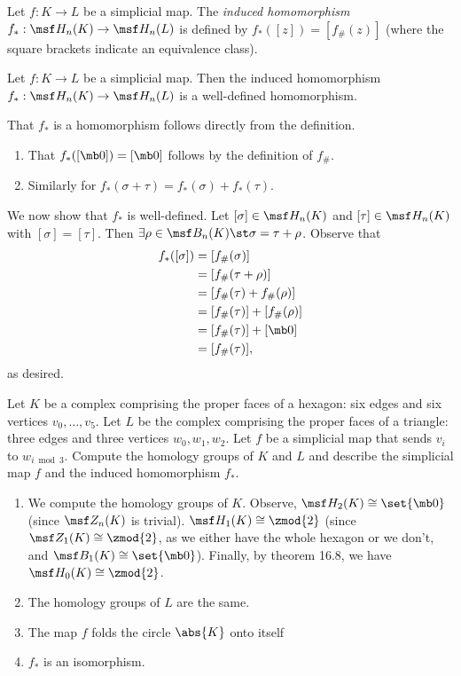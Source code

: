 \begin{definition}
  Let $f : K \to L$ be a simplicial map. The \emph{induced homomorphism} $f_* :
  \msf H_n(K) \to \msf H_n(L)$ is defined by $f_*([z]) = [f_\#(z)]$ (where the
  square brackets indicate an equivalence class).
\end{definition}
\begin{problem}[16.17]
  Let $f : K \to L$ be a simplicial map. Then the induced homomorphism $f_* :
  \msf H_n(K) \to \msf H_n(L)$ is a well-defined homomorphism.
\end{problem}
\begin{solution}
  That $f_*$ is a homomorphism follows directly from the definition.
  \begin{enumerate}[label=(\arabic*)]
    \item That $f_*([\mb 0]) = [\mb 0]$ follows by the definition of $f_{\#}$.
    \item Similarly for $f_*(\sigma + \tau) = f_*(\sigma) + f_*(\tau)$.
  \end{enumerate}
  We now show that $f_*$ is well-defined. Let $[\sigma] \in \msf H_n(K)$ and
  $[\tau] \in \msf H_n(K)$ with $[\sigma] = [\tau]$. Then $\exists \rho \in \msf
  B_n(K) \st \sigma = \tau + \rho$. Observe that
  \begin{align*}
    f_*([\sigma])
    &= [f_{\#}(\sigma)] \\
    &= [f_{\#}(\tau + \rho)] \\
    &= [f_{\#}(\tau) + f_{\#}(\rho)] \\
    &= [f_{\#}(\tau)] + [f_{\#}(\rho)] \\
    &= [f_{\#}(\tau)] + [\mb 0] \\
    &= [f_{\#}(\tau)],
  \end{align*}
  as desired.
\end{solution}
\begin{problem}[16.18]
  Let $K$ be a complex comprising the proper faces of a hexagon: six edges and
  six vertices $v_0, \ldots, v_5$. Let $L$ be the complex comprising the proper
  faces of a triangle: three edges and three vertices $w_0, w_1, w_2$. Let $f$
  be a simplicial map that sends $v_i$ to $w_{i \bmod 3}$. Compute the homology
  groups of $K$ and $L$ and describe the simplicial map $f$ and the induced
  homomorphism $f_*$.
\end{problem}
\begin{solution}
  \begin{enumerate}[label=(\arabic*)]
    \item We compute the homology groups of $K$. Observe, $\msf H_2(K) \cong
      \set{\mb 0}$ (since $\msf Z_n(K)$ is trivial). $\msf H_1(K) \cong
      \zmod{2}$ (since $\msf Z_1(K) \cong \zmod{2}$, as we either have the whole
      hexagon or we don't, and $\msf B_1(K) \cong \set{\mb 0}$). Finally, by
      theorem 16.8, we have $\msf H_0(K) \cong \zmod{2}$.
    \item The homology groups of $L$ are the same.
    \item The map $f$ folds the circle $\abs{K}$ onto itself
    \item $f_*$ is an isomorphism.
  \end{enumerate}
\end{solution}

